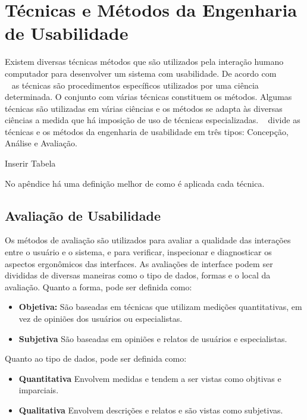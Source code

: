 
\section{Técnicas e Métodos da Engenharia de Usabilidade}


Existem diversas técnicas métodos que são utilizados pela interação humano computador para desenvolver um sistema com usabilidade.
%
De acordo com \\ ~ as técnicas são procedimentos específicos utilizados por uma ciência determinada. O conjunto com várias técnicas constituem os métodos. Algumas técnicas são utilizadas em várias ciências e os métodos se adapta às diversas ciências a medida que há imposição de uso de técnicas especializadas.
%
~ divide as técnicas e os métodos da engenharia de usabilidade em três tipos: Concepção, Análise e Avaliação.

Inserir Tabela

No apêndice há uma definição melhor de como é aplicada cada técnica.

\subsection {Avaliação de Usabilidade}

Os métodos de avaliação são utilizados para avaliar a qualidade das interações entre o usuário e o sistema, e para verificar, inspecionar e diagnosticar os aspectos ergonômicos das interfaces.
%
As avaliações de interface podem ser divididas de diversas maneiras como o tipo de dados, formas e o local da avaliação. Quanto a forma, pode ser definida como:

	\begin{itemize}
		\item \textbf{Objetiva:} São baseadas em técnicas que utilizam medições quantitativas, em vez de opiniões dos usuários ou especialistas.
		\item \textbf{Subjetiva} São baseadas em opiniões e relatos de usuários e especialistas.
	\end{itemize}

	Quanto ao tipo de dados, pode ser definida como:

	\begin{itemize}
		\item \textbf{Quantitativa} Envolvem medidas e tendem a ser vistas como objtivas e imparciais.
		\item \textbf{Qualitativa} Envolvem descrições e relatos e são vistas como subjetivas.
	\end{itemize}

